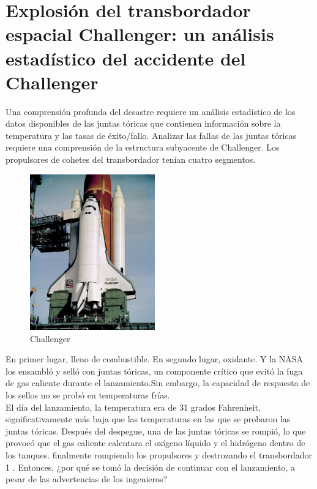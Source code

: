 \pagebreak
\section{Explosi\'on del transbordador espacial Challenger: un an\'alisis estad\'istico del accidente del Challenger}


Una comprensi\'on profunda del desastre requiere un an\'alisis estad\'istico de
los datos disponibles de las juntas t\'oricas que contienen informaci\'on sobre
la temperatura y las tasas de \'exito/fallo. Analizar las fallas de las juntas
t\'oricas requiere una comprensi\'on de la estructura subyacente de Challenger.
Los propulsores de cohetes del transbordador ten\'ian cuatro segmentos. 

\begin{figure} \vspace{-20pt} 
    \begin{center}
\includegraphics[width=0.48\textwidth]{figures/challenger.jpg} \end{center}
\vspace{-20pt} \caption{Challenger} \vspace{-10pt} \end{figure} 

En primer lugar, lleno de combustible. En segundo lugar, oxidante. Y la NASA los
ensambl\'o y sell\'o con juntas t\'oricas, un componente cr\'itico que evit\'o
la fuga de gas caliente durante el lanzamiento.Sin embargo, la capacidad de
respuesta de los sellos no se prob\'o en temperaturas fr\'ias. \\


El d\'ia del lanzamiento, la temperatura era de 31 grados Fahrenheit,
significativamente m\'as baja que las temperaturas en las que se probaron las
juntas t\'oricas. Despu\'es del despegue, una de las juntas t\'oricas se
rompi\'o, lo que provoc\'o que el gas caliente calentara el ox\'igeno l\'iquido
y el hidr\'ogeno dentro de los tanques. finalmente rompiendo los propulsores y
destrozando el transbordador 1 . Entonces, ¿por qu\'e se tom\'o la decisi\'on de
continuar con el lanzamiento, a pesar de las advertencias de los ingenieros? \\


